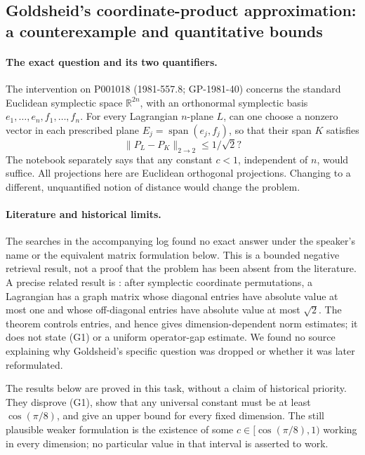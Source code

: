 \subsection{Goldsheid's coordinate-product approximation: a counterexample and quantitative bounds}
\label{dev:1981-goldsheid}

\paragraph{The exact question and its two quantifiers.}
The intervention on P001018 (1981-557.8; GP-1981-40) concerns the standard
Euclidean symplectic space \(\mathbb R^{2n}\), with an orthonormal symplectic
basis \(e_1,\ldots,e_n,f_1,\ldots,f_n\). For every Lagrangian \(n\)-plane
\(L\), can one choose a nonzero vector in each prescribed plane
\(E_j=\operatorname{span}(e_j,f_j)\), so that their span \(K\) satisfies
\[
 \|P_L-P_K\|_{2\to2}\le 1/\sqrt2? \tag{G1}
\]
The notebook separately says that any constant \(c<1\), independent of
\(n\), would suffice. All projections here are Euclidean orthogonal
projections. Changing to a different, unquantified notion of distance would
change the problem.

\paragraph{Literature and historical limits.}
The searches in the accompanying log found no exact answer under the
speaker's name or the equivalent matrix formulation below. This is a
bounded negative retrieval result, not a proof that the problem has been
absent from the literature. A precise related result is
\citet[Theorem 3.4]{mehrmannpoloni2012doubling}: after symplectic coordinate
permutations, a Lagrangian has a graph matrix whose diagonal entries have
absolute value at most one and whose off-diagonal entries have absolute
value at most \(\sqrt2\). The theorem controls entries, and hence gives
dimension-dependent norm estimates; it does not state (G1) or a uniform
operator-gap estimate. We found no source explaining why Goldsheid's
specific question was dropped or whether it was later reformulated.

The results below are proved in this task, without a claim of historical
priority. They disprove (G1), show that any universal constant must be at
least \(\cos(\pi/8)\), and give an upper bound for every fixed dimension.
The still plausible weaker formulation is the existence of some
\(c\in[\cos(\pi/8),1)\) working in every dimension; no particular value
in that interval is asserted to work.

